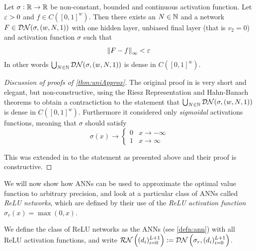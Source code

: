 \begin{thm}
  Let $\sigma: \mathbb{R} \to \mathbb{R}$ be non-constant, bounded and continuous
  activation function.
  Let $\varepsilon > 0$ and $f \in C([0,1]^w)$.
  Then there exists an $N \in \mathbb{N}$ and a network
  $F \in \mathcal{DN}(\sigma, (w, N, 1))$
  with one hidden layer,
  unbiased final layer (that is $v_2 = 0$)
  and activation function $\sigma$ such that
  \[ \norm{F - f}_\infty < \varepsilon \]
  In other words $\bigcup_{N \in \mathbb{N}} \mathcal{DN}(\sigma, (w, N, 1))$ is
  dense in $C([0,1]^w)$.
  \label{thm:uniApprox}
\end{thm}
\begin{proof}[Discussion of proofs of \cref{thm:uniApprox}]
  The original proof in  is very short and elegant,
  but non-constructive,
  using the Riesz Representation and Hahn-Banach theorems to
  obtain a contractiction to the statement that
  $\bigcup_{N \in \mathbb{N}} \mathcal{DN}(\sigma, (w,N,1))$
  is dense in $C([0,1]^w)$.
  Furthermore it considered only \emph{sigmoidal} activations
  functions, meaning that $\sigma$ should satisfy
  \[ \sigma(x) \to \begin{cases} 0 & x \to -\infty
  \\ 1 & x \to \infty \end{cases} \]
  
  This was extended in  to the statement as presented above
  and their proof is constructive. 
\end{proof}

We will now show how ANNs can be used to approximate the optimal
value function to arbitrary precision,
and look at a particular class of ANNs called \emph{ReLU networks},
which are defined by their use of the \emph{ReLU activation function}
$\sigma_r(x) = \max(0, x)$.

\begin{defn}
  We define the class of ReLU networks as the ANNs (see \cref{defn:ann})
  with all ReLU activation functions, and write
  $\mathcal{RN}\left( (d_i)_{i=0}^{L+1} \right)
  \vcentcolon= \mathcal{DN}\left( \sigma_r, (d_i)_{i=0}^{L+1} \right)$. 
  \label{defn:relu}
\end{defn}

